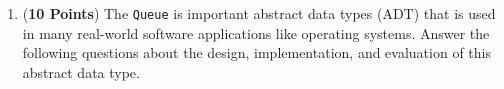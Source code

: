 \documentclass[12pt]{article}
\begin{document}
\begin{enumerate}
\begin{enumerate}
        \end{enumerate}

        \newpage

      \item ({\bf 10 Points}) The {\tt Queue} is important abstract data
        types (ADT) that is used in many real-world software applications
        like operating systems.  Answer the following questions about the
        design, implementation, and evaluation of this abstract data type.

        \begin{enumerate}






\end{enumerate}
\end{enumerate}
\end{document}
